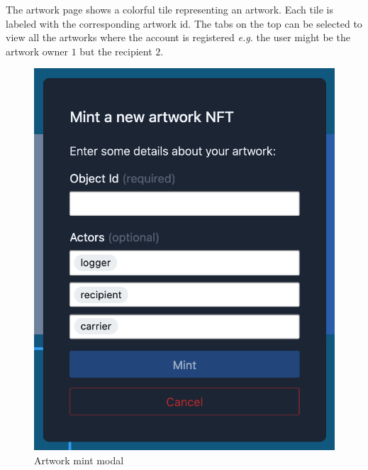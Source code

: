 The artwork page shows a colorful tile representing an artwork. Each tile is labeled with the corresponding artwork \gls{id}. The tabs on the top can be selected to view all the artworks where the account is registered \textit{e.g.} the user might be the artwork owner $1$ but the recipient $2$. 

\begin{figure}
    \centering
    \begin{minipage}{0.45\textwidth}
        \centering
        \includegraphics[height=0.4\textheight]{resources/frontend_screenshots/mint_modal.png}
        \caption{Artwork mint modal}
        \label{fig:mint_modal}
    \end{minipage}\hfill
    \begin{minipage}{0.45\textwidth}
        \centering

\end{minipage}
\end{figure}
